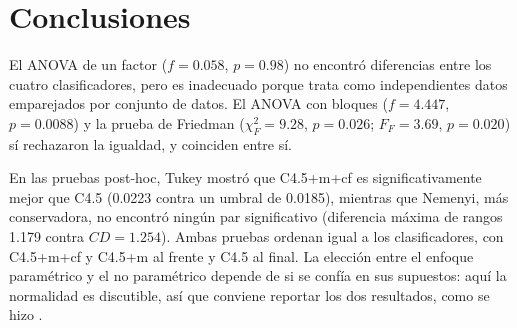 \documentclass[11pt,letterpaper]{article}
\begin{document}
\section{Conclusiones}

El ANOVA de un factor ($f = 0.058$, $p = 0.98$) no encontró diferencias entre los cuatro clasificadores, pero es inadecuado porque trata como independientes datos emparejados por conjunto de datos. El ANOVA con bloques ($f = 4.447$, $p = 0.0088$) y la prueba de Friedman ($\chi^2_F = 9.28$, $p = 0.026$; $F_F = 3.69$, $p = 0.020$) sí rechazaron la igualdad, y coinciden entre sí.

En las pruebas post-hoc, Tukey mostró que C4.5+m+cf es significativamente mejor que C4.5 (0.0223 contra un umbral de 0.0185), mientras que Nemenyi, más conservadora, no encontró ningún par significativo (diferencia máxima de rangos 1.179 contra $CD = 1.254$). Ambas pruebas ordenan igual a los clasificadores, con C4.5+m+cf y C4.5+m al frente y C4.5 al final. La elección entre el enfoque paramétrico y el no paramétrico depende de si se confía en sus supuestos: aquí la normalidad es discutible, así que conviene reportar los dos resultados, como se hizo \parencite{demsar2006,tecnm2026_tema32}.

\end{document}

